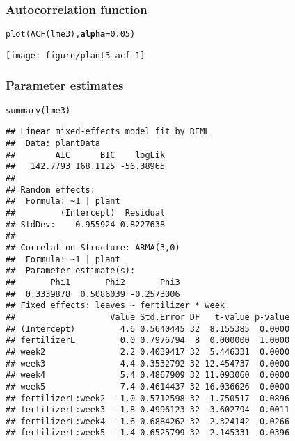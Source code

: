 \documentclass[color=usenames,dvipsnames]{beamer}\usepackage[]{graphicx}\usepackage[]{color}
\makeatletter
\newcommand{\hlnum}[1]{\textcolor[rgb]{0.69,0.494,0}{#1}}%
\newcommand{\hlstd}[1]{\textcolor[rgb]{0,0,0}{#1}}%
\newcommand{\hlkwc}[1]{\textcolor[rgb]{0,0,0}{\textbf{#1}}}%
\newcommand{\hlkwd}[1]{\textcolor[rgb]{0.004,0.004,0.506}{#1}}%
\newenvironment{kframe}{%
 \def\at@end@of@kframe{}%
 \ifinner\ifhmode%
  \def\at@end@of@kframe{\end{minipage}}%
  \begin{minipage}{\columnwidth}%
 \fi\fi%
 \def\FrameCommand##1{\hskip\@totalleftmargin \hskip-\fboxsep
 \colorbox{shadecolor}{##1}\hskip-\fboxsep
     \hskip-\linewidth \hskip-\@totalleftmargin \hskip\columnwidth}%
 \MakeFramed {\advance\hsize-\width
   \@totalleftmargin\z@ \linewidth\hsize
   \@setminipage}}%
 {\par\unskip\endMakeFramed%
 \at@end@of@kframe}
\newenvironment{knitrout}{}{} %
\makeatother
\begin{document}
\begin{frame}[fragile]
  \frametitle{Autocorrelation function}
\begin{knitrout}\small
{}\color{fgcolor}\begin{kframe}
\begin{alltt}
\hlkwd{plot}\hlstd{(}\hlkwd{ACF}\hlstd{(lme3),} \hlkwc{alpha}\hlstd{=}\hlnum{0.05}\hlstd{)}
\end{alltt}
\end{kframe}
\end{knitrout}
\centering
  \texttt{[image: figure/plant3-acf-1]} \\
\end{frame}




\begin{frame}[fragile]
  \frametitle{Parameter estimates}
\begin{knitrout}
\color{fgcolor}\begin{kframe}
\begin{alltt}
\hlkwd{summary}\hlstd{(lme3)}
\end{alltt}
\tiny
\begin{verbatim}
## Linear mixed-effects model fit by REML
##  Data: plantData
##        AIC      BIC    logLik
##   142.7793 168.1125 -56.38965
##
## Random effects:
##  Formula: ~1 | plant
##         (Intercept)  Residual
## StdDev:    0.955924 0.8227638
##
## Correlation Structure: ARMA(3,0)
##  Formula: ~1 | plant
##  Parameter estimate(s):
##       Phi1       Phi2       Phi3
##  0.3339878  0.5086039 -0.2573006
## Fixed effects: leaves ~ fertilizer * week
##                   Value Std.Error DF   t-value p-value
## (Intercept)         4.6 0.5640445 32  8.155385  0.0000
## fertilizerL         0.0 0.7976794  8  0.000000  1.0000
## week2               2.2 0.4039417 32  5.446331  0.0000
## week3               4.4 0.3532792 32 12.454737  0.0000
## week4               5.4 0.4867909 32 11.093060  0.0000
## week5               7.4 0.4614437 32 16.036626  0.0000
## fertilizerL:week2  -1.0 0.5712598 32 -1.750517  0.0896
## fertilizerL:week3  -1.8 0.4996123 32 -3.602794  0.0011
## fertilizerL:week4  -1.6 0.6884262 32 -2.324142  0.0266
## fertilizerL:week5  -1.4 0.6525799 32 -2.145331  0.0396
\end{verbatim}
\end{kframe}
\end{knitrout}
\end{frame}
\end{document}
